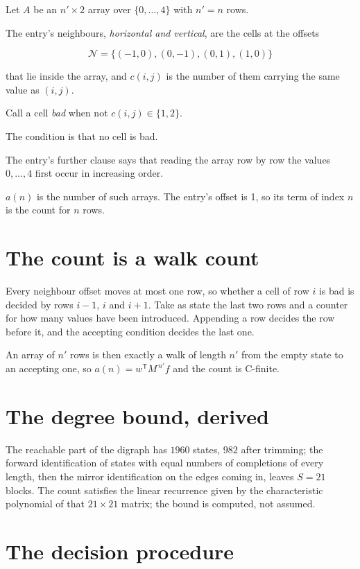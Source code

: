\documentclass[11pt]{article}
\theoremstyle{definition}
\begin{document}
Let $A$ be an $n' \times 2$ array over $\{0,\dots,4\}$ with $n' = n$ rows.

The entry's neighbours, {\itshape horizontal and vertical}, are the cells at the offsets

\[\mathcal{N} = \{(-1,0), (0,-1), (0,1), (1,0)\}\]

that lie inside the array, and $c(i,j)$ is the number of them carrying the same value as $(i,j)$.

Call a cell {\itshape bad} when not $c(i,j) \in \{1, 2\}$.

The condition is that no cell is bad.

The entry's further clause says that reading the array row by row the values $0,\dots,4$ first occur in increasing order.

$a(n)$ is the number of such arrays. The entry's offset is 1, so its term of index $n$ is the count for $n$ rows.

\section{The count is a walk count}

Every neighbour offset moves at most one row, so whether a cell of row $i$ is bad is decided by rows $i-1$, $i$ and $i+1$. Take as state the last two rows and a counter for how many values have been introduced. Appending a row decides the row before it, and the accepting condition decides the last one.

An array of $n'$ rows is then exactly a walk of length $n'$ from the empty state to an accepting one, so $a(n) = w^{\mathsf T}M^{\,n'}f$ and the count is C-finite.

\section{The degree bound, derived}

The reachable part of the digraph has $1960$ states, $982$ after trimming; the forward identification of states with equal numbers of completions of every length, then the mirror identification on the edges coming in, leaves $S = 21$ blocks. The count satisfies the linear recurrence given by the characteristic polynomial of that $21\times21$ matrix; the bound is computed, not assumed.

\section{The decision procedure}
\end{document}
